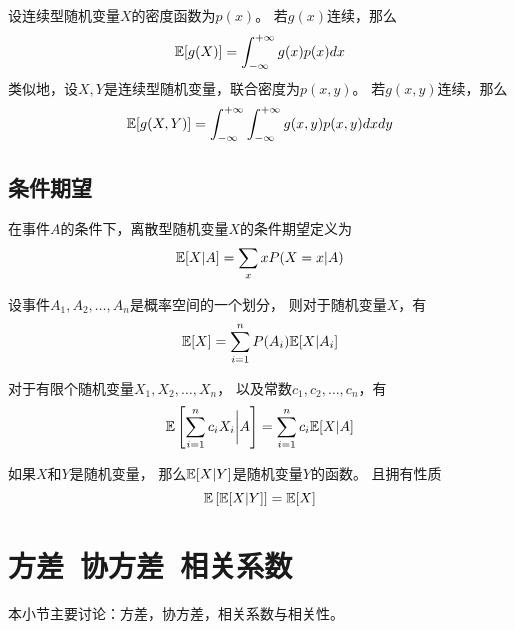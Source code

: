 \begin{theorem}
  设连续型随机变量$X$的密度函数为$p(x)$。
  若$g(x)$连续，那么
  \begin{displaymath}
    \mathbb{E}[g(X)] = \int_{-\infty}^{+\infty} g(x)p(x)dx
  \end{displaymath}
  类似地，设$X,Y$是连续型随机变量，联合密度为$p(x,y)$。
  若$g(x,y)$连续，那么
  \begin{displaymath}
    \mathbb{E}[g(X,Y)] = \int_{-\infty}^{+\infty}\int_{-\infty}^{+\infty} g(x,y)p(x,y)dxdy
  \end{displaymath}
\end{theorem}

\subsection{条件期望}
\begin{definition}[离散型随机变量的条件期望]
  在事件$A$的条件下，离散型随机变量$X$的条件期望定义为
  \begin{displaymath}
    \mathbb{E}[X|A] = \sum_{x} xP(X=x|A)
  \end{displaymath}
\end{definition}

\begin{theorem}[全期望公式]
  设事件$A_1,A_2,\dots,A_n$是概率空间的一个划分，
  则对于随机变量$X$，有
  \begin{displaymath}
    \mathbb{E}[X] = \sum_{i=1}^n P(A_i)\mathbb{E}[X|A_i]
  \end{displaymath}
\end{theorem}

\begin{theorem}[条件期望的线性性质]
  对于有限个随机变量$X_1,X_2,\dots,X_n$，
  以及常数$c_1,c_2,\dots,c_n$，有
  \begin{displaymath}
    \mathbb{E}\left[\sum_{i=1}^{n}c_iX_i\bigg|A\right] =
      \sum_{i=1}^{n}c_i\mathbb{E}[X|A]
  \end{displaymath}
\end{theorem}

\begin{theorem}[条件期望定义的随机变量]
  如果$X$和$Y$是随机变量，
  那么$\mathbb{E}[X|Y]$是随机变量$Y$的函数。
  且拥有性质
  \begin{displaymath}
    \mathbb{E}\left[\mathbb{E}[X|Y]\right] = \mathbb{E}[X]
  \end{displaymath}
\end{theorem}

\section{方差\ 协方差\ 相关系数}
本小节主要讨论：方差，协方差，相关系数与相关性。

